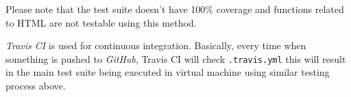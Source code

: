 \documentclass[master.tex]{subfiles}
\begin{document}
Please note that the test suite doesn't have 100\% coverage and functions
related to HTML are not testable using this method.

\emph{Travis CI} is used for continuous integration. Basically, every time when
something is pushed to \emph{GitHub}, Travis CI will check \texttt{.travis.yml}
this will result in the main test suite being executed in virtual machine using
similar testing process above.
\end{document}
